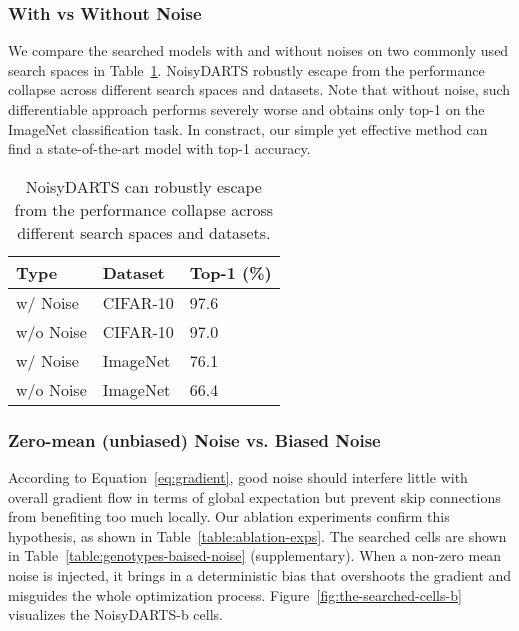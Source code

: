 \documentclass{article}
\begin{document}
\subsubsection{With vs Without Noise}
We compare the searched models with and without noises on two commonly used search spaces in Table~\ref{table:ablation-with-noise}.  NoisyDARTS  robustly escape from the performance collapse across different search spaces and datasets. Note that without noise,  such differentiable approach performs severely worse and obtains only  top-1 on the ImageNet classification task. In constract, our simple yet effective method can find a state-of-the-art model with  top-1 accuracy. 
\begin{table}
	\begin{center}
		\caption{NoisyDARTS can robustly escape from the performance collapse across different search spaces and datasets.}
		\label{table:ablation-with-noise}
		\begin{tabular}{*{3}{l}}
			\toprule
			Type & Dataset & Top-1 (\%)\\
			\midrule
			w/ Noise & CIFAR-10 & 97.6 \\
			w/o Noise & CIFAR-10 & 97.0 \\
			w/ Noise & ImageNet &  76.1 \\
			w/o Noise &ImageNet & 66.4\\
			\bottomrule
		\end{tabular}
	\end{center}
\end{table}

\subsubsection{Zero-mean (unbiased) Noise  vs. Biased Noise}
According to Equation~\ref{eq:gradient}, good noise should interfere little with overall gradient flow in terms of global expectation but prevent skip connections from benefiting too much locally. Our ablation experiments confirm this hypothesis, as shown in Table~\ref{table:ablation-exps}. The searched cells are shown in Table~\ref{table:genotypes-baised-noise} (supplementary). When a non-zero mean noise is injected, it brings in a deterministic bias that overshoots the gradient and misguides the whole optimization process. Figure~\ref{fig:the-searched-cells-b} visualizes the NoisyDARTS-b cells.
\end{document}
